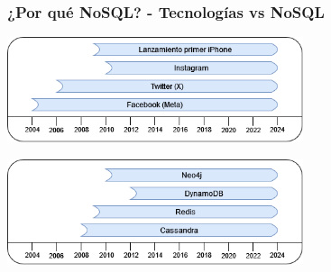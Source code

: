 \begin{frame}
    \frametitle{¿Por qué NoSQL? - Tecnologías vs NoSQL}

    \centering
    
    \includegraphics[width=0.65\textwidth]{diagramas/linea-temporal-tecno.png}

    \includegraphics[width=0.65\textwidth]{diagramas/lineatemporal-nosql.png}
\end{frame}